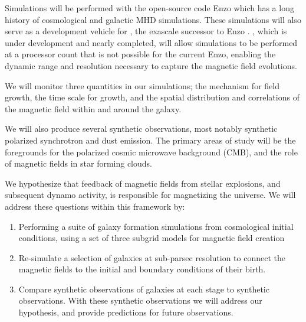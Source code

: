 
Simulations will be performed with the open-source code Enzo
\citep{Collins10,2014ApJS..211...19B} which has a long history of
cosmological and galactic MHD simulations.   These simulations will also serve as a development vehicle for 
\enzoe, the exascale successor to Enzo \citep{Bordner12,Bordner18}.  \enzoe, which is under development and
nearly completed, will allow simulations to be performed at a processor count
that is not possible for the current Enzo, 
enabling the dynamic range and resolution necessary to capture the
magnetic field evolutions.  

We will monitor three quantities in our simulations; the mechanism for field
growth, the time scale for growth, and the spatial distribution and correlations
of the magnetic field within and around the galaxy.   

We will also produce several synthetic observations, most notably
synthetic polarized synchrotron and dust emission.
The primary areas of study will be the foregrounds for the polarized cosmic
microwave background (CMB), and the
role of magnetic fields in star forming clouds.

We hypothesize that feedback of magnetic fields from
stellar explosions, and subsequent dynamo activity, is responsible for
magnetizing the universe.  We will address these questions within this
framework by:
\begin{enumerate}
\item Performing a suite of galaxy formation simulations from cosmological
initial conditions, using a set of three subgrid models for magnetic field
creation
\item Re-simulate a selection of galaxies at sub-parsec resolution to connect the
magnetic fields to the initial and boundary conditions of their birth.
\item Compare synthetic observations of galaxies at each stage to 
synthetic observations.  With these synthetic observations we will address
our hypothesis, and provide predictions for future observations.

\end{enumerate}
\vspace{-2mm}

